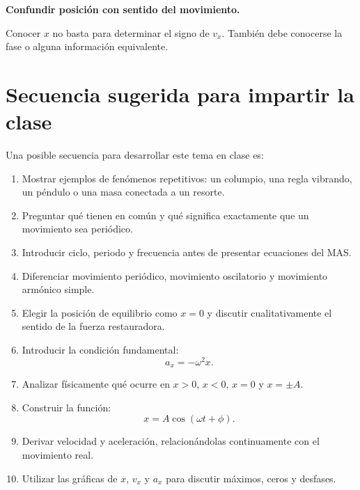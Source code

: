 \begin{errorfrecuente}
\textbf{Confundir posición con sentido del movimiento.}

Conocer \(x\) no basta para determinar el signo de \(v_x\). También debe conocerse la fase o alguna información equivalente.
\end{errorfrecuente}

\section{Secuencia sugerida para impartir la clase}

\begin{notapedagogica}
Una posible secuencia para desarrollar este tema en clase es:

\begin{enumerate}
    \item Mostrar ejemplos de fenómenos repetitivos: un columpio, una regla vibrando, un péndulo o una masa conectada a un resorte.

    \item Preguntar qué tienen en común y qué significa exactamente que un movimiento sea periódico.

    \item Introducir ciclo, periodo y frecuencia antes de presentar ecuaciones del MAS.

    \item Diferenciar movimiento periódico, movimiento oscilatorio y movimiento armónico simple.

    \item Elegir la posición de equilibrio como \(x=0\) y discutir cualitativamente el sentido de la fuerza restauradora.

    \item Introducir la condición fundamental:
    \[ a_x=-\omega^2x. \]

    \item Analizar físicamente qué ocurre en \(x>0\), \(x<0\), \(x=0\) y \(x=\pm A\).

    \item Construir la función:
    \[ x=A\cos(\omega t+\phi). \]

    \item Derivar velocidad y aceleración, relacionándolas continuamente con el movimiento real.

    \item Utilizar las gráficas de \(x\), \(v_x\) y \(a_x\) para discutir máximos, ceros y desfases.


\end{enumerate}
\end{notapedagogica}
